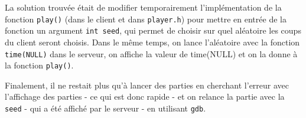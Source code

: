 La solution trouvée était de modifier temporairement l'implémentation de la fonction \texttt{play()} (dans le client et dans \texttt{player.h}) pour mettre en entrée de la fonction un argument \texttt{int seed}, qui permet de choisir sur quel aléatoire les coups du client seront choisis. Dans le même temps, on lance l'aléatoire avec la fonction \texttt{time(NULL)} dans le serveur, on affiche la valeur de time(NULL) et on la donne à la fonction \texttt{play()}.

Finalement, il ne restait plus qu'à lancer des parties en cherchant l'erreur avec l'affichage des parties - ce qui est donc rapide - et on relance la partie avec la \texttt{seed} - qui a été affiché par le serveur - en utilisant \texttt{gdb}.
